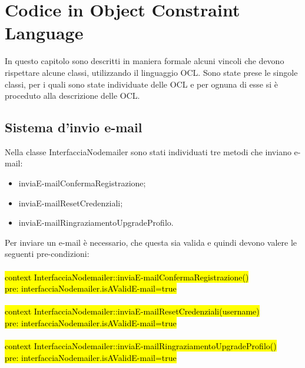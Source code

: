\section{Codice in Object Constraint Language}
In questo capitolo sono descritti in maniera formale alcuni vincoli che devono rispettare alcune classi, utilizzando il linguaggio OCL. Sono state prese le singole classi, per i quali sono state individuate delle OCL e per ognuna di esse si è proceduto alla descrizione delle OCL.

\subsection{Sistema d'invio e-mail}
Nella classe InterfacciaNodemailer sono stati individuati tre metodi che inviano e-mail:
\begin{itemize}
    \item inviaE-mailConfermaRegistrazione;
    \item inviaE-mailResetCredenziali;
    \item inviaE-mailRingraziamentoUpgradeProfilo.
\end{itemize}
Per inviare un e-mail è necessario, che questa sia valida e quindi devono valere le seguenti pre-condizioni: \\
\\
\hl{context InterfacciaNodemailer::inviaE-mailConfermaRegistrazione() \\
pre: interfacciaNodemailer.isAValidE-mail=true} \\
\\
\hl{context InterfacciaNodemailer::inviaE-mailResetCredenziali(username) \\
pre: interfacciaNodemailer.isAValidE-mail=true} \\
\\
\hl{context InterfacciaNodemailer::inviaE-mailRingraziamentoUpgradeProfilo() \\
pre: interfacciaNodemailer.isAValidE-mail=true} \\


